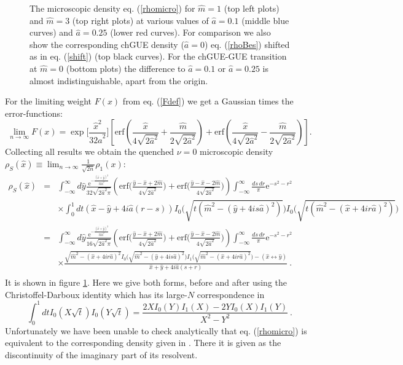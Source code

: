 \documentclass[11pt]{article}
\newcommand{\be}{\begin{equation}}
\newcommand{\ee}{\end{equation}}
\newcommand{\bea}{\begin{eqnarray}}
\newcommand{\eea}{\end{eqnarray}}
\newcommand{\nn}{\nonumber}
\newcommand{\e}{\mbox{e}}
\newcommand{\erf}{\mbox{erf}}
\newcommand{\hm}{\hat{m}}
\newcommand{\hx}{\hat{x}}
\newcommand{\hy}{\hat{y}}
\newcommand{\ha}{\hat{a}}
\begin{document}
\begin{figure}[-h]
\centerline{
}
\centerline{}
\caption{
The microscopic density eq. (\ref{rhomicro})
for $\hm=1$ (top left plots) and $\hm=3$ (top right plots)
at various values of $\ha=0.1$ (middle blue curves) and $\ha=0.25$
(lower red curves).
For comparison we also show the corresponding chGUE density ($\ha=0$) 
eq. (\ref{rhoBes}) shifted as in eq. (\ref{shift}) (top black curves).
For the chGUE-GUE transition at $\hm=0$ (bottom plots) the difference
to $\ha=0.1$ or $\ha=0.25$ is almost indistinguishable, apart from the origin.
}
\label{rhoSplot}
\end{figure}
For the limiting weight $F(x)$ from eq. (\ref{Fdef}) we get a Gaussian
times the error-functions:
\be
\lim_{n\to\infty}F(x)
=\exp\Big[\frac{\hx^2}{32\ha^2}\Big]\left[
\erf\left(\frac{\hx}{4\sqrt{2\ha^2}}+\frac{\hm}{2\sqrt{2\ha^2}}\right)
+\erf\left(\frac{\hx}{4\sqrt{2\ha^2}}-\frac{\hm}{2\sqrt{2\ha^2}}\right)\right].
\ee
Collecting all results we obtain the quenched $\nu=0$ microscopic density
$\rho_S(\hx)\equiv\lim_{n\to\infty}\frac{1}{\sqrt{2n}}\rho_1(x)$:
\bea
\rho_S(\hx)&=&
\int_{-\infty}^\infty
d\hat{y}\frac{\e^{-\frac{(\hx+\hy)^2}{32\ha^2}}}{32\sqrt{2\ha^2\pi}}
\left(\erf\Big(\frac{\hy-\hx+2\hm}{4\sqrt{2\ha^2}}\Big)
+\erf\Big(\frac{\hy-\hx-2\hm}{4\sqrt{2\ha^2}}\Big)
\right)\int_{-\infty}^\infty \frac{ds\,dr}{{\pi}}\e^{-s^2-r^2}\nn\\
&&\times
\int_0^1dt
(\hx-\hy+4i\ha(r-s))
I_0\Big( \sqrt{t(\hat{m}^2-(\hat{y}+4is\hat{a})^2)}\Big)
I_0\Big( \sqrt{t(\hat{m}^2-(\hat{x}+4ir\hat{a})^2)}\Big)
\nn\\
&=&
\int_{-\infty}^\infty
d\hat{y}
\frac{\e^{-\frac{(\hx+\hy)^2}{32\ha^2}}}{16\sqrt{2\ha^2\pi}}
\left(\erf\Big(\frac{\hy-\hx+2\hm}{4\sqrt{2\ha^2}}\Big)
+\erf\Big(\frac{\hy-\hx-2\hm}{4\sqrt{2\ha^2}}\Big)
\right)\int_{-\infty}^\infty \frac{ds\,dr}{{\pi}}\e^{-s^2-r^2}\nn\\
&&\times
\frac{
\sqrt{\hat{m}^2-(\hat{x}+4ir\hat{a})^2}
I_0\Big( \sqrt{\hat{m}^2-(\hat{y}+4is\hat{a})^2}\Big)
I_1\Big( \sqrt{\hat{m}^2-(\hat{x}+4ir\hat{a})^2}\Big)-(\hx\leftrightarrow\hy)
}{\hx+\hy+4i\ha(s+r)}\ .
\nn\\
\label{rhomicro}
\eea
It is shown in figure \ref{rhoSplot}. Here we give both forms, before
and after using the 
Christoffel-Darboux identity which has its large-$N$ correspondence in 
\be
\int_0^1 dt
I_0(X\sqrt{t})I_0(Y\sqrt{t})=\frac{2XI_0(Y)I_1(X)-2YI_0(X)I_1(Y)}{X^2-Y^2}\ .
\ee
Unfortunately we have been unable to check analytically that
eq. (\ref{rhomicro}) is equivalent to the corresponding density
given in \cite{DSV}. There it is given as the discontinuity of the
imaginary part of its resolvent. 
\end{document}
